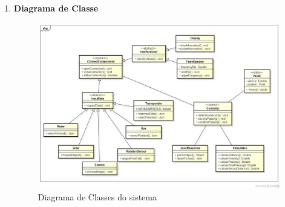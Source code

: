 \begin{enumerate}
\begin{enumerate}
  \item \textbf{Diagrama de Classe }
  \begin{figure}[h]
    \centering
    \includegraphics[width=450px, scale=1]{figuras/diagrama_classes}
    \caption{Diagrama de Classes do sistema}
  \label{fig:diagrama_classes}
  \end{figure}

\end{enumerate}


\end{enumerate}
